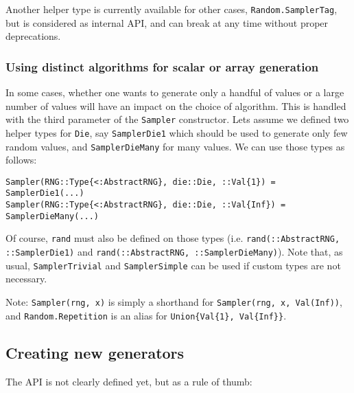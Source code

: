 Another helper type is currently available for other cases, \texttt{Random.SamplerTag}, but is considered as internal API, and can break at any time without proper deprecations.



\hypertarget{6227859827856272297}{}


\subsubsection{Using distinct algorithms for scalar or array generation}



In some cases, whether one wants to generate only a handful of values or a large number of values will have an impact on the choice of algorithm. This is handled with the third parameter of the \texttt{Sampler} constructor. Let{\textquotesingle}s assume we defined two helper types for \texttt{Die}, say \texttt{SamplerDie1} which should be used to generate only few random values, and \texttt{SamplerDieMany} for many values. We can use those types as follows:




\begin{verbatim}
Sampler(RNG::Type{<:AbstractRNG}, die::Die, ::Val{1}) = SamplerDie1(...)
Sampler(RNG::Type{<:AbstractRNG}, die::Die, ::Val{Inf}) = SamplerDieMany(...)
\end{verbatim}



Of course, \texttt{rand} must also be defined on those types (i.e. \texttt{rand(::AbstractRNG, ::SamplerDie1)} and \texttt{rand(::AbstractRNG, ::SamplerDieMany)}). Note that, as usual, \texttt{SamplerTrivial} and \texttt{SamplerSimple} can be used if custom types are not necessary.



Note: \texttt{Sampler(rng, x)} is simply a shorthand for \texttt{Sampler(rng, x, Val(Inf))}, and \texttt{Random.Repetition} is an alias for \texttt{Union\{Val\{1\}, Val\{Inf\}\}}.



\hypertarget{17633591859123150}{}


\subsection{Creating new generators}



The API is not clearly defined yet, but as a rule of thumb:



